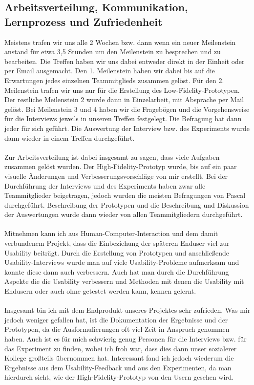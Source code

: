 \documentclass[a4paper,10pt]{scrartcl}
\begin{document}
\subsection{Arbeitsverteilung, Kommunikation, Lernprozess und Zufriedenheit}



Meistens trafen wir uns alle 2 Wochen bzw. dann wenn ein neuer Meilenstein anstand für etwa 3,5 Stunden um den Meilenstein zu besprechen und zu bearbeiten. Die Treffen haben wir uns
dabei entweder direkt in der Einheit oder per Email ausgemacht. Den 1. Meilenstein haben wir dabei bis auf die Erwartungen jedes einzelnen Teammitglieds zusammen gelöst.
Für den 2. Meilenstein trafen wir uns nur für die Erstellung des Low-Fidelity-Prototypen. Der restliche Meilenstein 2 wurde dann in Einzelarbeit, mit Absprache per Mail
gelöst. Bei Meilenstein 3 und 4 haben wir die Fragebögen und die Vorgehensweise für die Interviews
jeweils in unseren Treffen festgelegt. Die Befragung hat dann jeder für sich geführt. Die Auswertung der Interview bzw. des Experiments wurde dann wieder in einem Treffen
durchgeführt.
\\ \\
Zur Arbeitsverteilung ist dabei insgesamt zu sagen, dass viele Aufgaben zusammen gelöst wurden. Der High-Fidelity-Prototyp wurde, bis auf ein paar visuelle Änderungen
und Verbesserungsvorschläge von mir erstellt.
Bei der Durchführung der Interviews und des Experiments haben zwar alle Teammitglieder beigetragen, jedoch wurden die meisten Befragungen von Pascal durchgeführt. Beschreibung
der Prototypen und die Beschreibung und Diskussion der Auswertungen wurde dann wieder von allen Teammitgliedern durchgeführt.
\\ \\
Mitnehmen kann ich aus Human-Computer-Interaction und dem damit verbundenem Projekt, dass die Einbeziehung der späteren Enduser viel zur Usability beiträgt. Durch die Erstellung von Prototypen und anschließende Usability-Interviews wurde man auf viele Usability-Probleme aufmerksam und
konnte diese dann auch verbessern. Auch hat man durch die Durchführung Aspekte die die Usability verbessern und Methoden mit denen die Usability mit Endusern oder auch ohne
getestet werden kann, kennen gelernt.
\\ \\
Insgesamt bin ich mit dem Endprodukt unseres Projektes sehr zufrieden. Was mir jedoch weniger gefallen hat, ist die Dokumentation der Ergebnisse und der Prototypen, da
die Ausformulierungen oft viel Zeit in Anspruch genommen haben. Auch ist es für mich schwierig genug Personen für die Interviews bzw. für das Experiment zu finden, wobei
ich froh war, dass dies dann unser sozialerer Kollege großteils übernommen hat. Interessant fand ich jedoch wiederum die Ergebnisse aus dem Usability-Feedback und aus den Experimenten,
da man hierdurch sieht, wie der High-Fidelity-Prototyp von den Usern gesehen wird.
\\ \\
\end{document}
